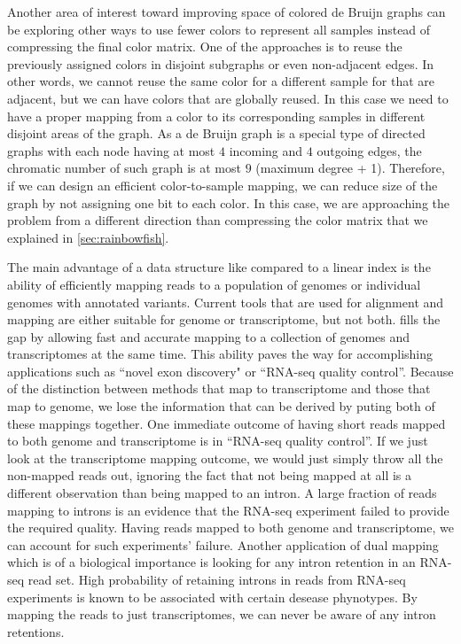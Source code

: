 Another area of interest toward improving space of colored de Bruijn graphs can be exploring other ways to use fewer colors to represent all samples instead of compressing the final color matrix. One of the approaches is to reuse the previously assigned colors in disjoint subgraphs or even non-adjacent edges. In other words, we cannot reuse the same color for a different sample for \kmers that are adjacent, but we can have colors that are globally reused. In this case we need to have a proper mapping from a color to its corresponding samples in different disjoint areas of the graph. As a de Bruijn graph is a special type of directed graphs with each node having at most $4$ incoming and $4$ outgoing edges, the chromatic number of such graph is at most $9$ (maximum degree + 1). Therefore, if we can design an efficient color-to-sample mapping, we can reduce size of the graph by not assigning one bit to each color. In this case, we are approaching the problem from a different direction than compressing the color matrix that we explained in \ref{sec:rainbowfish}.

The main advantage of a data structure like \pufferfish compared to a linear index is the ability of efficiently mapping reads to a population of genomes or individual genomes with annotated variants. Current tools that are used for alignment and mapping are either suitable for genome or transcriptome, but not both. \pufferfish fills the gap by allowing fast and accurate mapping to a collection of genomes and transcriptomes at the same time. This ability paves the way for accomplishing applications such as ``novel exon discovery" or ``RNA-seq quality control''. 
Because of the distinction between methods that map to transcriptome and those that map to genome, we lose the information that can be derived by puting both of these mappings together. One immediate outcome of having short reads mapped to both genome and transcriptome is in ``RNA-seq quality control''. If we just look at the transcriptome mapping outcome, we would just simply throw all the non-mapped reads out, ignoring the fact that not being mapped at all is a different observation than being mapped to an intron. A large fraction of reads mapping to introns is an evidence that the RNA-seq experiment failed to provide the required quality. Having reads mapped to both genome and transcriptome, we can account for such experiments' failure. Another application of dual mapping which is of a biological importance is looking for any intron retention in an RNA-seq read set. High probability of retaining introns in reads from RNA-seq experiments is known to be associated with certain desease phynotypes. By mapping the reads to just transcriptomes, we can never be aware of any intron retentions.

